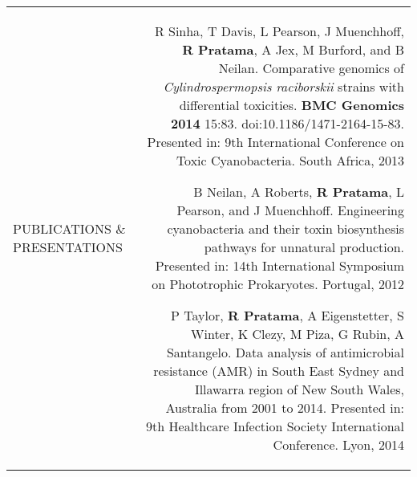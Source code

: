 \documentclass[a4paper,10pt]{article}
\newcommand\VRule{\color{lightgray}\vrule}
\newcommand\HRule{}
\begin{document}
\vspace{0.15in}
\begin{tabular}{L!{\VRule}R}
\uppercase{Publications \& Presentations \HRule} &  
R Sinha, T Davis, L Pearson, J Muenchhoff, \textbf{R Pratama}, A Jex, M Burford, and B Neilan.
Comparative genomics of \textit{Cylindrospermopsis raciborskii} strains with differential toxicities. \textbf{BMC Genomics 2014} 15:83. doi:10.1186/1471-2164-15-83. Presented in: 9th International Conference on Toxic Cyanobacteria. South Africa, 2013
  \vspace{0.10in}
  
B Neilan, A Roberts, \textbf{R Pratama}, L Pearson, and J Muenchhoff.
Engineering cyanobacteria and their toxin biosynthesis  pathways for unnatural production.
Presented in: 14th International Symposium on Phototrophic Prokaryotes. Portugal, 2012
  \vspace{0.10in}
  
P Taylor, \textbf{R Pratama}, A Eigenstetter, S Winter, K Clezy, M Piza, G Rubin, A Santangelo. Data analysis of antimicrobial resistance (AMR) in South East Sydney and Illawarra region of New South Wales, Australia from 2001 to 2014. Presented in: 9th Healthcare Infection Society International Conference. Lyon, 2014
\\
\end{tabular}


\vspace{0.15in}
\end{document}
